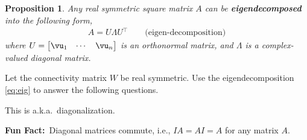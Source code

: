 \documentclass[a4paper,11pt]{exam}
\newtheorem{proposition}[theorem]{Proposition}
\newcounter{ct}
\newcommand{\trp}{{^\top}} %
\newcommand{\funfact}{\textbf{Fun Fact:}~}
\begin{document}
\begin{questions}
\begin{proposition}
Any \textit{real symmetric square matrix} $A$ can be \textbf{eigendecomposed} into the following form,
\begin{align}\label{eq:eig}
    A = U \Lambda U\trp \qquad \text{(eigen-decomposition)}
\end{align}
where $U = \begin{bmatrix}\vu_1 & \cdots & \vu_n \end{bmatrix}$
is an orthonormal matrix, and $\Lambda$ is a complex-valued diagonal matrix.
\end{proposition}

\question Let the connectivity matrix $W$ be real symmetric. Use the eigendecomposition \eqref{eq:eig} to answer the following questions.

This is a.k.a.~diagonalization.

\clearpage

\begin{tcolorbox}
\funfact Diagonal matrices commute, i.e., $IA = AI = A$ for any matrix $A$.
\end{tcolorbox}


\question
\end{questions}
\end{document}
